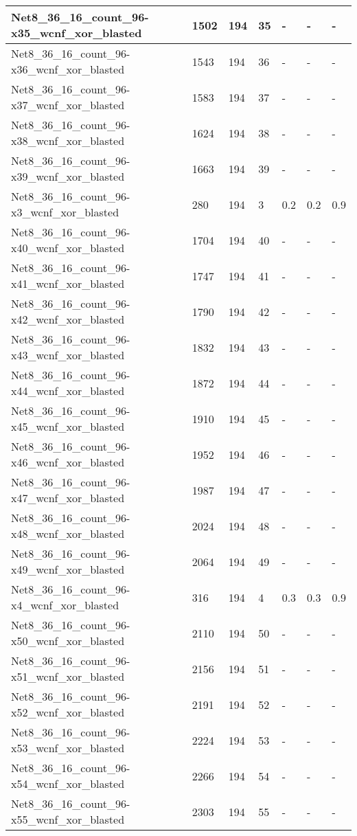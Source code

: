 \begin{scriptsize}
\begin{longtable}{|p{5cm}|l|l|l|l|l|l|}
Net8\_36\_16\_count\_96-x35\_wcnf\_xor\_blasted&1502&194&35&-&-&- \\ \hline 
Net8\_36\_16\_count\_96-x36\_wcnf\_xor\_blasted&1543&194&36&-&-&- \\ \hline 
Net8\_36\_16\_count\_96-x37\_wcnf\_xor\_blasted&1583&194&37&-&-&- \\ \hline 
Net8\_36\_16\_count\_96-x38\_wcnf\_xor\_blasted&1624&194&38&-&-&- \\ \hline 
Net8\_36\_16\_count\_96-x39\_wcnf\_xor\_blasted&1663&194&39&-&-&- \\ \hline 
Net8\_36\_16\_count\_96-x3\_wcnf\_xor\_blasted&280&194&3&0.2&0.2&0.9 \\ \hline 
Net8\_36\_16\_count\_96-x40\_wcnf\_xor\_blasted&1704&194&40&-&-&- \\ \hline 
Net8\_36\_16\_count\_96-x41\_wcnf\_xor\_blasted&1747&194&41&-&-&- \\ \hline 
Net8\_36\_16\_count\_96-x42\_wcnf\_xor\_blasted&1790&194&42&-&-&- \\ \hline 
Net8\_36\_16\_count\_96-x43\_wcnf\_xor\_blasted&1832&194&43&-&-&- \\ \hline 
Net8\_36\_16\_count\_96-x44\_wcnf\_xor\_blasted&1872&194&44&-&-&- \\ \hline 
Net8\_36\_16\_count\_96-x45\_wcnf\_xor\_blasted&1910&194&45&-&-&- \\ \hline 
Net8\_36\_16\_count\_96-x46\_wcnf\_xor\_blasted&1952&194&46&-&-&- \\ \hline 
Net8\_36\_16\_count\_96-x47\_wcnf\_xor\_blasted&1987&194&47&-&-&- \\ \hline 
Net8\_36\_16\_count\_96-x48\_wcnf\_xor\_blasted&2024&194&48&-&-&- \\ \hline 
Net8\_36\_16\_count\_96-x49\_wcnf\_xor\_blasted&2064&194&49&-&-&- \\ \hline 
Net8\_36\_16\_count\_96-x4\_wcnf\_xor\_blasted&316&194&4&0.3&0.3&0.9 \\ \hline 
Net8\_36\_16\_count\_96-x50\_wcnf\_xor\_blasted&2110&194&50&-&-&- \\ \hline 
Net8\_36\_16\_count\_96-x51\_wcnf\_xor\_blasted&2156&194&51&-&-&- \\ \hline 
Net8\_36\_16\_count\_96-x52\_wcnf\_xor\_blasted&2191&194&52&-&-&- \\ \hline 
Net8\_36\_16\_count\_96-x53\_wcnf\_xor\_blasted&2224&194&53&-&-&- \\ \hline 
Net8\_36\_16\_count\_96-x54\_wcnf\_xor\_blasted&2266&194&54&-&-&- \\ \hline 
Net8\_36\_16\_count\_96-x55\_wcnf\_xor\_blasted&2303&194&55&-&-&- \\ \hline 

\end{longtable}
\end{scriptsize}
